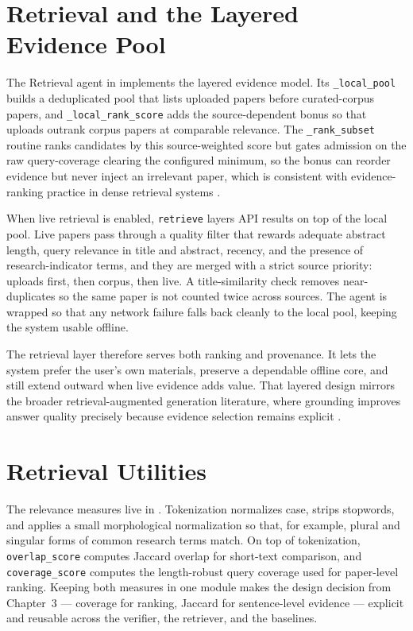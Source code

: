 \section{Retrieval and the Layered Evidence Pool }

The Retrieval agent in  implements the layered evidence model. Its \texttt{\_local\_pool}
builds a deduplicated pool that lists uploaded papers before curated-corpus papers, and \texttt{\_local\_rank\_score}
adds the source-dependent bonus so that uploads outrank corpus papers at comparable relevance. The
\texttt{\_rank\_subset} routine ranks candidates by this source-weighted score but gates admission on the raw
query-coverage clearing the configured minimum, so the bonus can reorder evidence but never inject an irrelevant
paper, which is consistent with evidence-ranking practice in dense retrieval systems \cite{karpukhin2020dpr,khattab2020colbert,thakur2021beir}.

When live retrieval is enabled, \texttt{retrieve} layers API results on top of the local pool. Live papers pass
through a quality filter that rewards adequate abstract length, query relevance in title and abstract, recency, and
the presence of research-indicator terms, and they are merged with a strict source priority: uploads first, then
corpus, then live. A title-similarity check removes near-duplicates so the same paper is not counted twice across
sources. The agent is wrapped so that any network failure falls back cleanly to the local pool, keeping the system
usable offline.

The retrieval layer therefore serves both ranking and provenance. It lets the system prefer the user's own
materials, preserve a dependable offline core, and still extend outward when live evidence adds value.
That layered design mirrors the broader retrieval-augmented generation literature, where grounding improves
answer quality precisely because evidence selection remains explicit \cite{lewis2020rag,guu2020realm,ragsurvey2024}.

\section{Retrieval Utilities }

The relevance measures live in . Tokenization normalizes case, strips stopwords, and applies a
small morphological normalization so that, for example, plural and singular forms of common research terms match.
On top of tokenization, \texttt{overlap\_score} computes Jaccard overlap for short-text comparison, and
\texttt{coverage\_score} computes the length-robust query coverage used for paper-level ranking. Keeping both
measures in one module makes the design decision from Chapter~3 --- coverage for ranking, Jaccard for
sentence-level evidence --- explicit and reusable across the verifier, the retriever, and the baselines.

